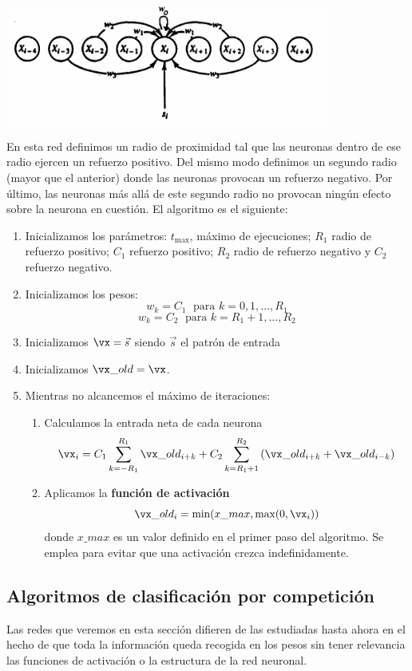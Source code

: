 \begin{center}
\includegraphics[width=0.8\textwidth]{img/mexicanHat.png}
\label{figure:mexicanHat}
\end{center}

En esta red definimos un radio de proximidad tal que las neuronas dentro de ese radio ejercen un refuerzo positivo. Del mismo modo definimos un segundo radio (mayor que el anterior) donde las neuronas provocan un refuerzo negativo. Por último, las neuronas más allá de este segundo radio no provocan ningún efecto sobre la neurona en cuestión. El algoritmo es el siguiente:

\begin{enumerate}
\item Inicializamos los parámetros: $t_{\text{max}}$, máximo de ejecuciones; $R_1$ radio de refuerzo positivo; $C_1$ refuerzo positivo; $R_2$ radio de refuerzo negativo y $C_2$ refuerzo negativo.
\item Inicializamos los pesos:
\[w_k = C_1 \; \text{ para } k = 0,1,...,R_1\]
\[w_k = C_2 \; \text{ para } k = R_1+1,...,R_2\]
\item Inicializamos $\vx=\vec{s}$ siendo $\vec{s}$ el patrón de entrada
\item Inicializamos $\vx\_old = \vx$.
\item Mientras no alcancemos el máximo de iteraciones:
\begin{enumerate}
\item Calculamos la entrada neta de cada neurona
\[\vx_i = C_1 \sum_{k=-R_1}^{R_1}\vx\_old_{i+k} + C_2 \sum_{k=R_1+1}^{R_2}\left(\vx\_old_{i+k}+\vx\_old_{i-k}\right)\]
\item Aplicamos la \textbf{función de activación}
\[\vx\_old_i = \min(x\_max, \max(0,\vx_i))\]
donde $x\_max$ es un valor definido en el primer paso del algoritmo. Se emplea para evitar que una activación crezca indefinidamente.
\end{enumerate}
\end{enumerate}

\subsection{Algoritmos de clasificación por competición}
Las redes que veremos en esta sección difieren de las estudiadas hasta ahora en el hecho de que toda la información queda recogida en los pesos sin tener relevancia las funciones de activación o la estructura de la red neuronal.

